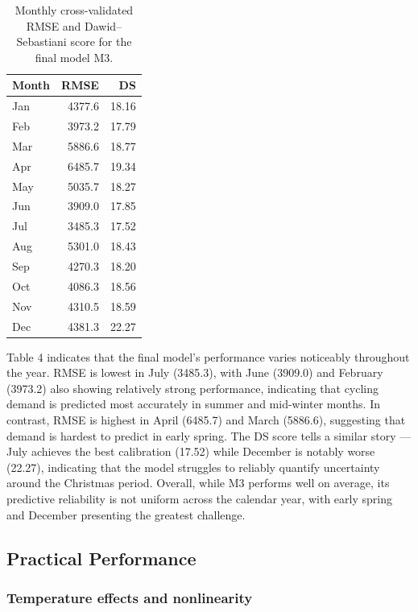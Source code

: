 \documentclass[
]{article}
\begin{document}
\begin{table}[!h]
\centering
\caption{\label{tab:unnamed-chunk-4}Monthly cross-validated RMSE and Dawid--Sebastiani score for the final model M3.}
\centering
\begin{tabular}[t]{lrr}
\toprule
Month & RMSE & DS\\
\midrule
Jan & 4377.6 & 18.16\\
Feb & 3973.2 & 17.79\\
Mar & 5886.6 & 18.77\\
Apr & 6485.7 & 19.34\\
May & 5035.7 & 18.27\\
\addlinespace
Jun & 3909.0 & 17.85\\
Jul & 3485.3 & 17.52\\
Aug & 5301.0 & 18.43\\
Sep & 4270.3 & 18.20\\
Oct & 4086.3 & 18.56\\
\addlinespace
Nov & 4310.5 & 18.59\\
Dec & 4381.3 & 22.27\\
\bottomrule
\end{tabular}
\end{table}

Table 4 indicates that the final model's performance varies noticeably
throughout the year. RMSE is lowest in July (3485.3), with June (3909.0)
and February (3973.2) also showing relatively strong performance,
indicating that cycling demand is predicted most accurately in summer
and mid-winter months. In contrast, RMSE is highest in April (6485.7)
and March (5886.6), suggesting that demand is hardest to predict in
early spring. The DS score tells a similar story --- July achieves the
best calibration (17.52) while December is notably worse (22.27),
indicating that the model struggles to reliably quantify uncertainty
around the Christmas period. Overall, while M3 performs well on average,
its predictive reliability is not uniform across the calendar year, with
early spring and December presenting the greatest challenge.

\subsection{Practical Performance}\label{practical-performance}

\subsubsection{Temperature effects and nonlinearity}\label{temperature-effects-and-nonlinearity}
\end{document}
